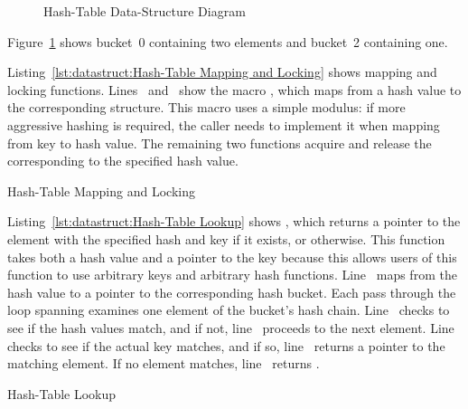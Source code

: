 \begin{figure}
\centering
{}
\caption{Hash-Table Data-Structure Diagram}
\label{fig:datastruct:Hash-Table Data-Structure Diagram}
\end{figure}

Figure~\ref{fig:datastruct:Hash-Table Data-Structure Diagram}
shows bucket~0 containing two elements and bucket~2 containing one.

\begin{fcvref}
Listing~\ref{lst:datastruct:Hash-Table Mapping and Locking}
shows mapping and locking functions.
Lines~ and~
show the macro , which maps from a hash value
to the corresponding  structure.
This macro uses a simple modulus: if more aggressive hashing is required,
the caller needs to implement it when mapping from key to hash value.
The remaining two functions acquire and release the 
corresponding to the specified hash value.
\end{fcvref}

\begin{listing}

\caption{Hash-Table Mapping and Locking}
\label{lst:datastruct:Hash-Table Mapping and Locking}
\end{listing}

\begin{fcvref}
Listing~\ref{lst:datastruct:Hash-Table Lookup}
shows ,
which returns a pointer to the element with the specified hash and key if it
exists, or  otherwise.
This function takes both a hash value and a pointer to the key because
this allows users of this function to use arbitrary keys and
arbitrary hash functions.
Line~ maps from the hash value to a pointer to the corresponding
hash bucket.
Each pass through the loop spanning
 examines one element
of the bucket's hash chain.
Line~ checks to see if the hash values match, and if not,
line~
proceeds to the next element.
Line~ checks to see if the actual key matches, and if so,
line~ returns a pointer to the matching element.
If no element matches, line~ returns .
\end{fcvref}

\begin{listing}

\caption{Hash-Table Lookup}
\label{lst:datastruct:Hash-Table Lookup}
\end{listing}

